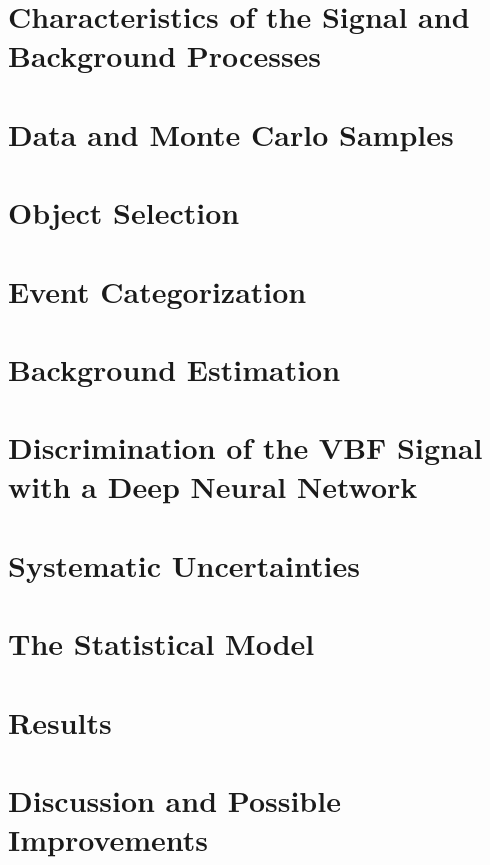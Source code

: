 \section{Characteristics of the Signal and Background Processes}
\label{sec:signal-bkg-characteristics}


\section{Data and Monte Carlo Samples}
\label{sec:data-mc-samples}


\section{Object Selection}
\label{sec:object-selection}


\section{Event Categorization}
\label{sec:event-categorization}


\section{Background Estimation}
\label{sec:bkg-estimation}


\section{Discrimination of the VBF Signal with a Deep Neural Network}
\label{sec:dnn}


\FloatBarrier
\section{Systematic Uncertainties}
\label{sec:systematics}



\section{The Statistical Model}
\label{sec:stats-analysis}


\FloatBarrier
\section{Results}
\label{sec:hww-results}


\FloatBarrier
\section{Discussion and Possible Improvements}
\label{sec:hww:summary}

